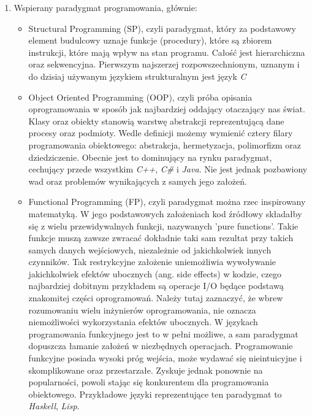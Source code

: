 \documentclass[skorowidz,skroty]{dyplomWEZUT}
\begin{document}
\begin{enumerate}
\item Wspierany paradygmat programowania, głównie:
\begin{itemize}
	\item Structural Programming (SP), czyli paradygmat, który za podstawowy element budulcowy uznaje funkcje (procedury), które są zbiorem instrukcji, które mają wpływ na stan programu. Całość jest hierarchiczna oraz sekwencyjna. Pierwszym najszerzej rozpowszechnionym, uznanym i do dzisiaj używanym językiem strukturalnym jest język \textit{C}
	\item Object Oriented Programming (OOP), czyli próba opisania oprogramowania w sposób jak najbardziej oddający otaczający nas świat. Klasy oraz obiekty stanowią warstwę abstrakcji reprezentującą dane procesy oraz podmioty. Wedle definicji możemy wymienić cztery filary programowania obiektowego: abstrakcja, hermetyzacja, polimorfizm oraz dziedziczenie. Obecnie jest to dominujący na rynku paradygmat, cechujący przede wszystkim \textit{C++}, \textit{C\#} i \textit{Java}. Nie jest jednak pozbawiony wad oraz problemów wynikających z samych jego założeń. 
	\item Functional Programming (FP), czyli paradygmat można rzec inspirowany matematyką. W jego podstawowych założeniach kod źródłowy składałby się z wielu przewidywalnych funkcji, nazywanych 'pure functions'. Takie funkcje muszą zawsze zwracać dokładnie taki sam rezultat przy takich samych danych wejściowych, niezależnie od jakichkolwiek innych czynników. Tak restrykcyjne założenie uniemożliwia wywoływanie jakichkolwiek efektów ubocznych (ang. side effects) w kodzie, czego najbardziej dobitnym przykładem są operacje I/O będące podstawą znakomitej części oprogramowań. Należy tutaj zaznaczyć, że wbrew rozumowaniu wielu inżynierów oprogramowania, nie oznacza niemożliwości wykorzystania efektów ubocznych. W językach programowania funkcyjnego jest to w pełni możliwe, a sam paradygmat dopuszcza łamanie założeń w niezbędnych operacjach. Programowanie funkcyjne posiada wysoki próg wejścia, może wydawać się nieintuicyjne i skomplikowane oraz przestarzałe. Zyskuje jednak ponownie na popularności, powoli stając się konkurentem dla programowania obiektowego. Przykładowe języki reprezentujące ten paradygmat to \textit{Haskell}, \textit{Lisp}.
\end{itemize}  


\end{enumerate}
\end{document}
